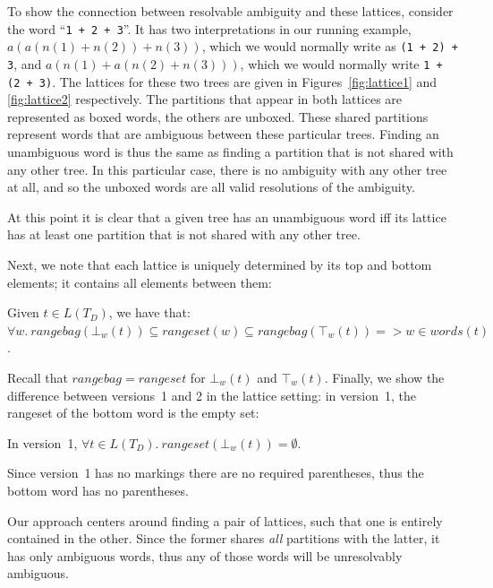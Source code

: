 \documentclass[acmsmall,review,anonymous]{acmart}\settopmatter{printfolios=true,printccs=false,printacmref=false}
\newcommand{\words}{\mathit{words}} %
\newcommand{\alt}{\mathit{alt}} %
\newcommand{\rangebag}{\mathit{rangebag}} %
\newcommand{\rangeset}{\mathit{rangeset}} %
\newcommand{\topw}{\top_w} %
\newcommand{\botw}{\bot_w} %
\begin{document}
To show the connection between resolvable ambiguity and these lattices, consider the word ``\verb|1 + 2 + 3|''. It has two interpretations in our running example, $a(a(n(1)+n(2))+n(3))$, which we would normally write as \verb|(1 + 2) + 3|, and $a(n(1)+a(n(2)+n(3)))$, which we would normally write \verb|1 + (2 + 3)|. The lattices for these two trees are given in Figures~\ref{fig:lattice1} and \ref{fig:lattice2} respectively. The partitions that appear in both lattices are represented as boxed words, the others are unboxed. These shared partitions represent words that are ambiguous between these particular trees. Finding an unambiguous word is thus the same as finding a partition that is not shared with any other tree. In this particular case, there is no ambiguity with any other tree at all, and so the unboxed words are all valid resolutions of the ambiguity.

At this point it is clear that a given tree has an unambiguous word iff its lattice has at least one partition that is not shared with any other tree.

Next, we note that each lattice is uniquely determined by its top and bottom elements; it contains all elements between them:

\begin{lemma}
  Given $t \in L(T_D)$, we have that:\\
  $\forall w.\ \rangebag(\botw(t)) \subseteq \rangeset(w) \subseteq \rangebag(\topw(t)) => w \in \words(t)$. \label{lemma:top-bottom-determine}
\end{lemma}

\noindent Recall that $\rangebag = \rangeset$ for $\botw(t)$ and $\topw(t)$. Finally, we show the difference between versions~1 and 2 in the lattice setting: in version~1, the rangeset of the bottom word is the empty set:

\begin{lemma}
  In version~1, $\forall t \in L(T_D).\ \rangeset(\botw(t)) = \emptyset$. \label{lemma:version1-bot}
\end{lemma}

\noindent Since version~1 has no markings there are no required parentheses, thus the bottom word has no parentheses.

Our approach centers around finding a pair of lattices, such that one is entirely contained in the other. Since the former shares \emph{all} partitions with the latter, it has only ambiguous words, thus any of those words will be unresolvably ambiguous.
\end{document}
